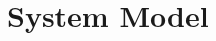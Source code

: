 \documentclass[conference]{IEEEtran}
\begin{document}







\section{System Model}

\label{sec:model}


\end{document}
